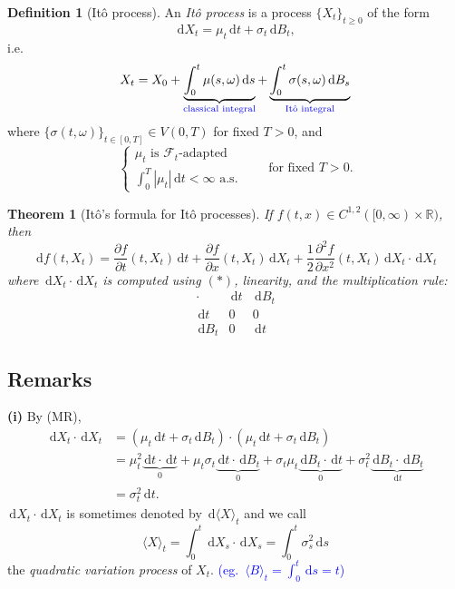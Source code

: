 \documentclass[11pt]{article}
\newcommand{\R}{\mathbb{R}}
\newcommand{\F}{\mathcal{F}}
\newcommand{\dd}{\,\mathrm{d}}
\newcommand{\ann}[1]{\textcolor{blue}{#1}}
\theoremstyle{definition}
\newtheorem{definition}{Definition}[section]
\theoremstyle{plain}
\newtheorem{theorem}{Theorem}[section]
\begin{document}
\begin{definition}[It\^o process]
An \emph{It\^o process} is a process $\{X_t\}_{t\ge0}$ of the form
\begin{equation*}
  \dd X_t=\mu_t\dd t+\sigma_t\dd B_t , \tag*{$(\ast)$}
\end{equation*}
i.e.
\[
  X_t=X_0+\underbrace{\int_0^t\mu(s,\omega)\dd s}_{\ann{\text{classical integral}}}
  +\underbrace{\int_0^t\sigma(s,\omega)\dd B_s}_{\ann{\text{It\^o integral}}}
\]
where $\{\sigma(t,\omega)\}_{t\in[0,T]}\in V(0,T)$ for fixed $T>0$, and
\[
  \begin{cases}
    \mu_t \text{ is } \F_t\text{-adapted}\\[2pt]
    \displaystyle\int_0^T|\mu_t|\dd t<\infty \text{ a.s.}
  \end{cases}
  \qquad\text{for fixed } T>0.
\]
\end{definition}

\begin{theorem}[It\^o's formula for It\^o processes]
If $f(t,x)\in C^{1,2}([0,\infty)\times\R)$, then
\begin{equation*}
  \dd f(t,X_t)
  =\frac{\partial f}{\partial t}(t,X_t)\dd t
  +\frac{\partial f}{\partial x}(t,X_t)\dd X_t
  +\frac12\frac{\partial^2f}{\partial x^2}(t,X_t)\dd X_t\cdot\dd X_t \tag*{(IF)}
\end{equation*}
where $\dd X_t\cdot\dd X_t$ is computed using $(\ast)$, linearity, and the
multiplication rule:
\[
  \begin{array}{c|cc}
    \cdot & \dd t & \dd B_t\\[2pt] \hline
    \dd t & 0 & 0\\[2pt]
    \dd B_t & 0 & \dd t
  \end{array}
  \tag*{(MR)}
\]
\end{theorem}

\subsection*{Remarks}

\noindent\textbf{(i)} By (MR),
\begin{align*}
  \dd X_t\cdot\dd X_t
    &=(\mu_t\dd t+\sigma_t\dd B_t)\cdot(\mu_t\dd t+\sigma_t\dd B_t)\\
    &=\mu_t^2\underbrace{\dd t\cdot\dd t}_{0}
      +\mu_t\sigma_t\underbrace{\dd t\cdot\dd B_t}_{0}
      +\sigma_t\mu_t\underbrace{\dd B_t\cdot\dd t}_{0}
      +\sigma_t^2\underbrace{\dd B_t\cdot\dd B_t}_{\dd t}\\
    &=\sigma_t^2\dd t .
\end{align*}
$\dd X_t\cdot\dd X_t$ is sometimes denoted by $\dd\langle X\rangle_t$ and we call
\[
  \langle X\rangle_t=\int_0^t\dd X_s\cdot\dd X_s=\int_0^t\sigma_s^2\dd s
\]
the \emph{quadratic variation process} of $X_t$.
\ann{(eg.\ $\langle B\rangle_t=\int_0^t\dd s=t$)}
\end{document}
